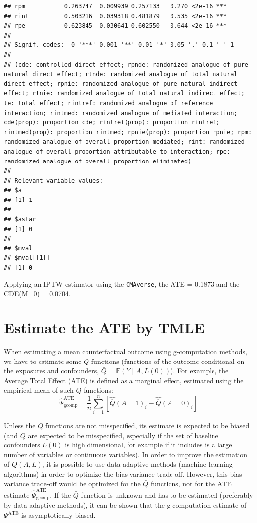 \documentclass[
]{book}
\begin{document}
\begin{verbatim}
## rpm           0.263747  0.009939 0.257133   0.270 <2e-16 ***
## rint          0.503216  0.039318 0.481879   0.535 <2e-16 ***
## rpe           0.623845  0.030641 0.602550   0.644 <2e-16 ***
## ---
## Signif. codes:  0 '***' 0.001 '**' 0.01 '*' 0.05 '.' 0.1 ' ' 1
## 
## (cde: controlled direct effect; rpnde: randomized analogue of pure natural direct effect; rtnde: randomized analogue of total natural direct effect; rpnie: randomized analogue of pure natural indirect effect; rtnie: randomized analogue of total natural indirect effect; te: total effect; rintref: randomized analogue of reference interaction; rintmed: randomized analogue of mediated interaction; cde(prop): proportion cde; rintref(prop): proportion rintref; rintmed(prop): proportion rintmed; rpnie(prop): proportion rpnie; rpm: randomized analogue of overall proportion mediated; rint: randomized analogue of overall proportion attributable to interaction; rpe: randomized analogue of overall proportion eliminated)
## 
## Relevant variable values: 
## $a
## [1] 1
## 
## $astar
## [1] 0
## 
## $mval
## $mval[[1]]
## [1] 0
\end{verbatim}

Applying an IPTW estimator using the \texttt{CMAverse}, the ATE = 0.1873 and the CDE(M=0) = 0.0704.

\chapter{Estimate the ATE by TMLE}\label{estimate-the-ate-by-tmle}

When estimating a mean counterfactual outcome using g-computation methods, we have to estimate some \(\bar{Q}\) functions (functions of the outcome conditional on the exposures and confounders, \(\bar{Q}=\mathbb{E}\left(Y\mid A,L(0)\right)\)). For example, the Average Total Effect (ATE) is defined as a marginal effect, estimated using the empirical mean of such \(\bar{Q}\) functions:
\begin{equation*}
\hat{\Psi}^{\text{ATE}}_{\text{gcomp}} = \frac{1}{n} \sum_{i=1}^n \left[ \hat{\overline{Q}}(A=1)_i - \hat{\overline{Q}}(A=0)_i \right]
\end{equation*}

Unless the \(\bar{Q}\) functions are not misspecified, its estimate is expected to be biased (and \(\bar{Q}\) are expected to be misspecified, especially if the set of baseline confounders \(L(0)\) is high dimensional, for example if it includes is a large number of variables or continuous variables). In order to improve the estimation of \(\bar{Q}(A,L)\), it is possible to use data-adaptive methods (machine learning algorithms) in order to optimize the bias-variance trade-off. However, this bias-variance trade-off would be optimized for the \(\bar{Q}\) functions, not for the ATE estimate \(\hat{\Psi}^\text{ATE}_\text{gcomp}\). If the \(\bar{Q}\) function is unknown and has to be estimated (preferably by data-adaptive methods), it can be shown that the g-computation estimate of \(\Psi^\text{ATE}\) is asymptotically biased.
\end{document}
